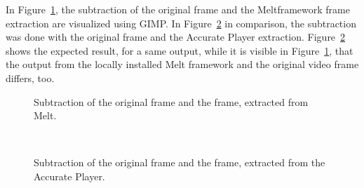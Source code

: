 \documentclass[../MasterThesis.tex]{subfiles}
\begin{document}
\vspace*{2em}
In Figure~\ref{figure:oVSmelt}, the subtraction of the original frame and the Meltframework frame extraction are visualized using GIMP. In Figure~\ref{figure:oVSap} in comparison, the subtraction was done with the original frame and the Accurate Player extraction. Figure~\ref{figure:oVSap} shows the expected result, for a same output, while it is visible in Figure~\ref{figure:oVSmelt}, that the output from the locally installed Melt framework and the original video frame differs, too.


\begin{minipage}{0.48\textwidth}
	\begin{figure}[H]
		\begin{center}
			\caption[Subtraction of the two frames (original video and Melt).]{Subtraction of the original frame and the frame, extracted from Melt.}
			\label{figure:oVSmelt}
		\end{center}
	\end{figure}
\end{minipage}\begin{minipage}{0.04\textwidth}
	\ 
\end{minipage}\begin{minipage}{0.48\textwidth}
	\begin{figure}[H]
		\begin{center}
			\caption[Subtraction of the two frames (original video and Accurate Player).]{Subtraction of the original frame and the frame, extracted from the Accurate Player.}
			\label{figure:oVSap}
		\end{center}
	\end{figure}
\end{minipage}





\end{document}
